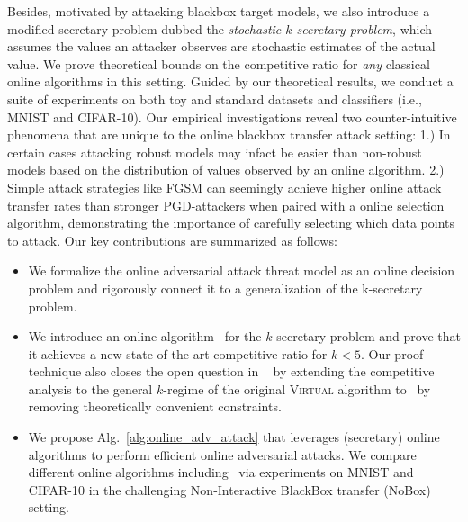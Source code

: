 Besides, motivated by attacking blackbox target models, we also introduce a modified secretary problem dubbed the \textit{stochastic $k$-secretary problem}, which assumes the values an attacker observes are stochastic estimates of the actual value. We prove theoretical bounds on the competitive ratio for \emph{any} classical online algorithms in this setting. Guided by our theoretical results, we conduct a suite of experiments on both toy and standard datasets and classifiers (i.e., MNIST and CIFAR-10). Our empirical investigations reveal two counter-intuitive phenomena that are unique to the online blackbox transfer attack setting: 1.) In certain cases attacking robust models may infact be easier than non-robust models based on the distribution of values observed by an online algorithm. 2.) Simple attack strategies like FGSM can seemingly achieve higher online attack transfer rates than stronger PGD-attackers when paired with a online selection algorithm, demonstrating the importance of carefully selecting which data points to attack. Our key contributions are summarized as follows:



\begin{itemize}[noitemsep,topsep=0pt,parsep=0pt,partopsep=0pt,label={\large\textbullet},leftmargin=*]
\item We formalize the online adversarial attack threat model as an online decision problem and rigorously connect it to a generalization of the k-secretary problem.
\item We introduce an online algorithm \algoname\ for the $k$-secretary problem and prove that it achieves a new state-of-the-art competitive ratio for $k<5$. Our proof technique also closes the open question in ~\citet{babaioff2007knapsack} by extending the competitive analysis to the general $k$-regime of the original \textsc{Virtual} algorithm to \algoname\ by removing theoretically convenient constraints. %
\item We propose Alg.~\ref{alg:online_adv_attack} that leverages (secretary) online algorithms to perform efficient online adversarial attacks. We compare different online algorithms including \algoname\ via experiments on MNIST and CIFAR-10 in the challenging Non-Interactive BlackBox transfer (NoBox) setting.%
\end{itemize}

